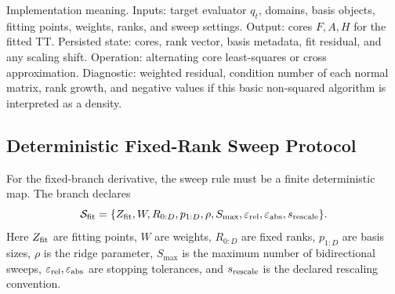 \documentclass[11pt]{article}
\begin{document}
Implementation meaning. Inputs: target evaluator \(q_t\), domains,
basis objects, fitting points, weights, ranks, and sweep settings.  Output:
cores \(F,A,H\) for the fitted TT.  Persisted state: cores, rank vector, basis
metadata, fit residual, and any scaling shift.  Operation: alternating core
least-squares or cross approximation.  Diagnostic: weighted residual, condition
number of each normal matrix, rank growth, and negative values if this basic
non-squared algorithm is interpreted as a density.

\subsection*{Deterministic Fixed-Rank Sweep Protocol}

For the fixed-branch derivative, the sweep rule must be a finite deterministic
map.  The branch declares
\[
    \mathcal S_{\rm fit}
    =
    \{Z_{\rm fit},W,R_{0:D},p_{1:D},\rho,S_{\max},
      \varepsilon_{\rm rel},\varepsilon_{\rm abs},s_{\rm rescale}\}.
    \label{eq:p24-p23-sweep1}
\]
Here \(Z_{\rm fit}\) are fitting points, \(W\) are weights, \(R_{0:D}\) are
fixed ranks, \(p_{1:D}\) are basis sizes, \(\rho\) is the ridge parameter,
\(S_{\max}\) is the maximum number of bidirectional sweeps,
\(\varepsilon_{\rm rel},\varepsilon_{\rm abs}\) are stopping tolerances, and
\(s_{\rm rescale}\) is the declared rescaling convention.
\end{document}
